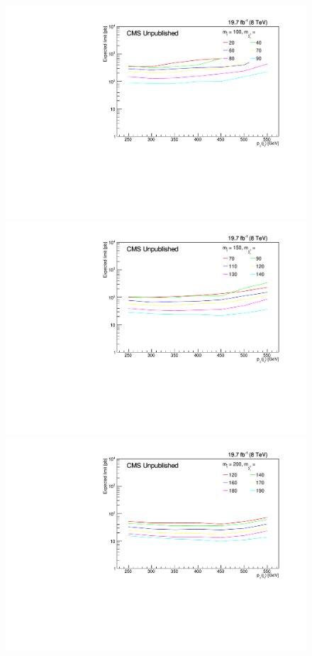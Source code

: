 \begin{figure}[!Ht]
  \begin{center}
  \includegraphics[scale=0.35]{Figures/sus13009/limitplots/plots/stop/expected_100.pdf}
  \includegraphics[scale=0.35]{Figures/sus13009/limitplots/plots/stop/expected_150.pdf}
  \includegraphics[scale=0.35]{Figures/sus13009/limitplots/plots/stop/expected_200.pdf} 

\end{center}
\end{figure}
